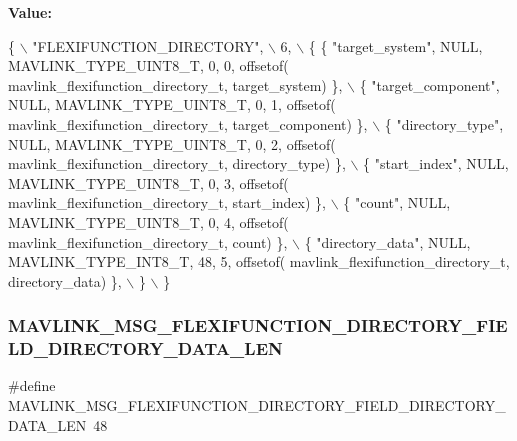 {\bfseries Value\+:}
\begin{DoxyCode}
\{ \(\backslash\)
    \textcolor{stringliteral}{"FLEXIFUNCTION\_DIRECTORY"}, \(\backslash\)
    6, \(\backslash\)
    \{  \{ \textcolor{stringliteral}{"target\_system"}, NULL, MAVLINK_TYPE_UINT8_T, 0, 0, offsetof(
      mavlink_flexifunction_directory_t, target\_system) \}, \(\backslash\)
         \{ \textcolor{stringliteral}{"target\_component"}, NULL, MAVLINK_TYPE_UINT8_T, 0, 1, offsetof(
      mavlink_flexifunction_directory_t, target\_component) \}, \(\backslash\)
         \{ \textcolor{stringliteral}{"directory\_type"}, NULL, MAVLINK_TYPE_UINT8_T, 0, 2, offsetof(
      mavlink_flexifunction_directory_t, directory\_type) \}, \(\backslash\)
         \{ \textcolor{stringliteral}{"start\_index"}, NULL, MAVLINK_TYPE_UINT8_T, 0, 3, offsetof(
      mavlink_flexifunction_directory_t, start\_index) \}, \(\backslash\)
         \{ \textcolor{stringliteral}{"count"}, NULL, MAVLINK_TYPE_UINT8_T, 0, 4, offsetof(
      mavlink_flexifunction_directory_t, count) \}, \(\backslash\)
         \{ \textcolor{stringliteral}{"directory\_data"}, NULL, MAVLINK_TYPE_INT8_T, 48, 5, offsetof(
      mavlink_flexifunction_directory_t, directory\_data) \}, \(\backslash\)
         \} \(\backslash\)
\}
\end{DoxyCode}
\mbox{\label{mavlink__msg__flexifunction__directory_8h_a1aac6c7cb9146816f592dca913f9cd9e}} 
\subsubsection{M\+A\+V\+L\+I\+N\+K\+\_\+\+M\+S\+G\+\_\+\+F\+L\+E\+X\+I\+F\+U\+N\+C\+T\+I\+O\+N\+\_\+\+D\+I\+R\+E\+C\+T\+O\+R\+Y\+\_\+\+F\+I\+E\+L\+D\+\_\+\+D\+I\+R\+E\+C\+T\+O\+R\+Y\+\_\+\+D\+A\+T\+A\+\_\+\+L\+EN}
{\footnotesize\ttfamily \#define M\+A\+V\+L\+I\+N\+K\+\_\+\+M\+S\+G\+\_\+\+F\+L\+E\+X\+I\+F\+U\+N\+C\+T\+I\+O\+N\+\_\+\+D\+I\+R\+E\+C\+T\+O\+R\+Y\+\_\+\+F\+I\+E\+L\+D\+\_\+\+D\+I\+R\+E\+C\+T\+O\+R\+Y\+\_\+\+D\+A\+T\+A\+\_\+\+L\+EN~48}

